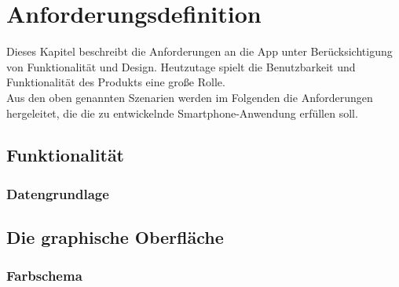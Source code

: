 \chapter{\label{chap:anforderungen}Anforderungsdefinition}
Dieses Kapitel beschreibt die Anforderungen an die \gls{App} unter Berücksichtigung von Funktionalität und Design. Heutzutage spielt die Benutzbarkeit und Funktionalität des Produkts eine große Rolle.\\
Aus den oben genannten Szenarien werden im Folgenden die Anforderungen hergeleitet, die die zu entwickelnde \gls{Smartphone}-Anwendung erfüllen soll.
\section{Funktionalität}
\subsection{Datengrundlage}
\section{Die graphische Oberfläche}
\subsection{Farbschema}